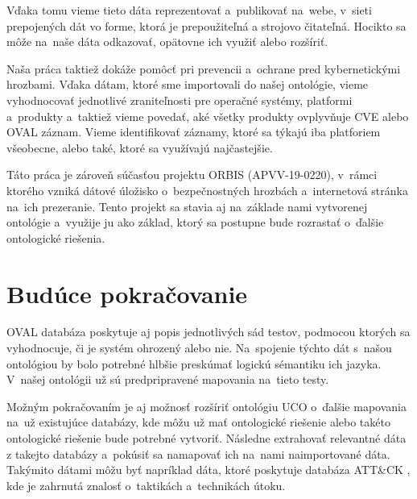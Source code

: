 \documentclass[12pt, a4paper, oneside]{book}
\begin{document}
Vďaka tomu vieme tieto dáta reprezentovať a~publikovať na~webe, v~sieti prepojených dát vo forme, ktorá je prepoužiteľná a
strojovo čitateľná. Hocikto sa môže na~naše dáta odkazovať, opätovne ich využiť alebo rozšíriť. 


Naša práca taktiež dokáže pomôcť pri prevencii a~ochrane pred
kybernetickými hrozbami. Vďaka dátam, ktoré sme importovali do našej ontológie, vieme vyhodnocovať jednotlivé zraniteľnosti pre operačné systémy, platformi a~produkty a~taktiež vieme povedať, aké všetky produkty ovplyvňuje CVE alebo OVAL záznam. Vieme identifikovať záznamy, ktoré sa týkajú iba platforiem všeobecne, alebo také, ktoré sa využívajú najčastejšie.


Táto práca je zároveň súčasťou projektu ORBIS (APVV-19-0220), v~rámci ktorého vzniká dátové úložisko o~bezpečnostných hrozbách a~internetová stránka na~ich prezeranie. Tento projekt sa stavia aj na~základe nami vytvorenej ontológie a~využije ju ako základ, ktorý sa postupne bude rozrastať o~ďalšie ontologické riešenia.


\section*{Budúce pokračovanie}
OVAL databáza poskytuje aj popis jednotlivých sád testov, podmocou ktorých sa vyhodnocuje, či je systém ohrozený alebo nie. Na~spojenie týchto dát s~našou ontológiou by bolo potrebné hlbšie preskúmať logickú sémantiku ich jazyka. V~našej ontológii už sú predpripravené mapovania na~tieto testy.


Možným pokračovaním je aj možnosť rozšíriť ontológiu UCO o~ďalšie mapovania na~už existujúce databázy, kde môžu už mať ontologické riešenie alebo takéto ontologické riešenie bude potrebné vytvoriť. Následne extrahovať relevantné dáta z takejto databázy a~pokúsiť sa namapovať ich na~nami naimportované dáta. Takýmito dátami môžu byť napríklad dáta, ktoré poskytuje databáza ATT\&{}CK \citep{attck}, kde je zahrnutá znalosť o~taktikách a~technikách útoku.
\end{document}
